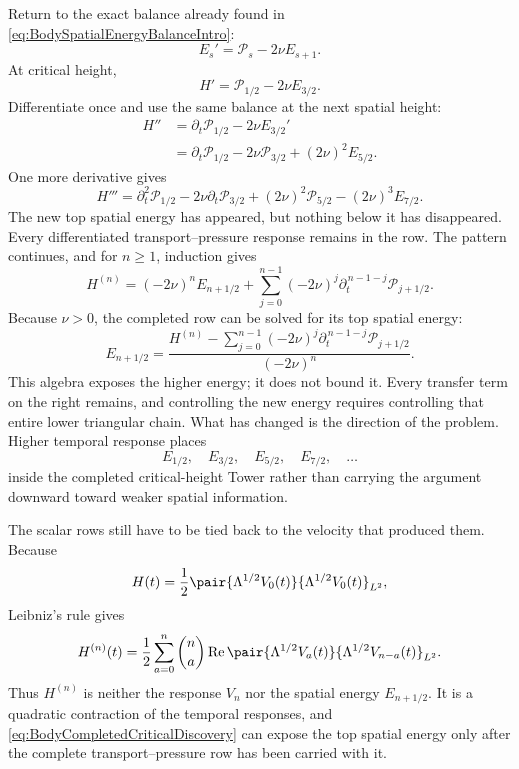 Return to the exact balance already found in
\eqref{eq:BodySpatialEnergyBalanceIntro}:
\[
  E_s'=\mathcal P_s-2\nu E_{s+1}.
\]
At critical height,
\[
  H'=\mathcal P_{1/2}-2\nu E_{3/2}.
\]
Differentiate once and use the same balance at the next spatial height:
\[
\begin{aligned}
  H''
  &=\partial_t\mathcal P_{1/2}-2\nu E_{3/2}'
  \\
  &=\partial_t\mathcal P_{1/2}
  -2\nu\mathcal P_{3/2}
  +(2\nu)^2E_{5/2}.
\end{aligned}
\]
One more derivative gives
\[
  H'''
  =\partial_t^2\mathcal P_{1/2}
  -2\nu\partial_t\mathcal P_{3/2}
  +(2\nu)^2\mathcal P_{5/2}
  -(2\nu)^3E_{7/2}.
\]
The new top spatial energy has appeared, but nothing below it has disappeared.
Every differentiated transport--pressure response remains in the row.  The
pattern continues, and for \(n\geq1\), induction gives
\begin{equation}\label{eq:BodyCriticalHeightDiscovery}
  H^{(n)}
  =(-2\nu)^nE_{n+1/2}
  +\sum_{j=0}^{n-1}
  (-2\nu)^j
  \partial_t^{\,n-1-j}\mathcal P_{j+1/2}.
\end{equation}
Because \(\nu>0\), the completed row can be solved for its top spatial energy:
\begin{equation}\label{eq:BodyCompletedCriticalDiscovery}
  E_{n+1/2}
  =\frac{
    H^{(n)}-
    \displaystyle\sum_{j=0}^{n-1}
    (-2\nu)^j\partial_t^{\,n-1-j}\mathcal P_{j+1/2}
  }{(-2\nu)^n}.
\end{equation}
This algebra exposes the higher energy; it does not bound it.  Every transfer
term on the right remains, and controlling the new energy requires controlling
that entire lower triangular chain.  What has changed is the direction of the
problem.  Higher temporal response places
\[
  E_{1/2},
  \quad E_{3/2},
  \quad E_{5/2},
  \quad E_{7/2},
  \quad\ldots
\]
inside the completed critical-height Tower rather than carrying the argument
downward toward weaker spatial information.

The scalar rows still have to be tied back to the velocity that produced them.
Because
\[
  H(t)=\frac12
  \pair{\Lambda^{1/2}V_0(t)}
       {\Lambda^{1/2}V_0(t)}_{L^2},
\]
Leibniz's rule gives
\begin{equation}\label{eq:BodyHeightDerivativeTemporalContraction}
  H^{(n)}(t)
  =\frac12\sum_{a=0}^{n}\binom{n}{a}
  \operatorname{Re}
  \pair{\Lambda^{1/2}V_a(t)}
       {\Lambda^{1/2}V_{n-a}(t)}_{L^2}.
\end{equation}
Thus \(H^{(n)}\) is neither the response \(V_n\) nor the spatial energy
\(E_{n+1/2}\).  It is a quadratic contraction of the temporal responses, and
\eqref{eq:BodyCompletedCriticalDiscovery} can expose the top spatial energy
only after the complete transport--pressure row has been carried with it.

